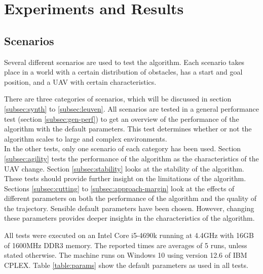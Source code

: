 \chapter{Experiments and Results}
\label{section:analysis}

\section{Scenarios}
Several different scenarios are used to test the algorithm. Each scenario takes place in a world with a certain distribution of obstacles, has a start and goal position, and a UAV with certain characteristics.
\par
There are three categories of scenarios, which will be discussed in section \ref{subsec:synth} to \ref{subsec:leuven}. All scenarios are tested in a general performance test (section \ref{subsec:gen-perf}) to get an overview of the performance of the algorithm with the default parameters. This test determines whether or not the algorithm scales to large and complex environments.\\
In the other tests, only one scenario of each category has been used. Section \ref{subsec:agility} tests the performance of the algorithm as the characteristics of the UAV change. Section \ref{subsec:stability} looks at the stability of the algorithm. These tests should provide further insight on the limitations of the algorithm.\\

Sections \ref{subsec:cutting} to \ref{subsec:approach-margin} look at the effects of different parameters on both the performance of the algorithm and the quality of the trajectory. Sensible default parameters have been chosen. However, changing these parameters provides deeper insights in the characteristics of the algorithm.

All tests were executed on an Intel Core i5-4690k running at 4.4GHz with 16GB of 1600MHz DDR3 memory. The reported times are averages of 5 runs, unless stated otherwise. The machine runs on Windows 10 using version 12.6 of IBM CPLEX. Table \ref{table:params} show the default parameters as used in all tests.

